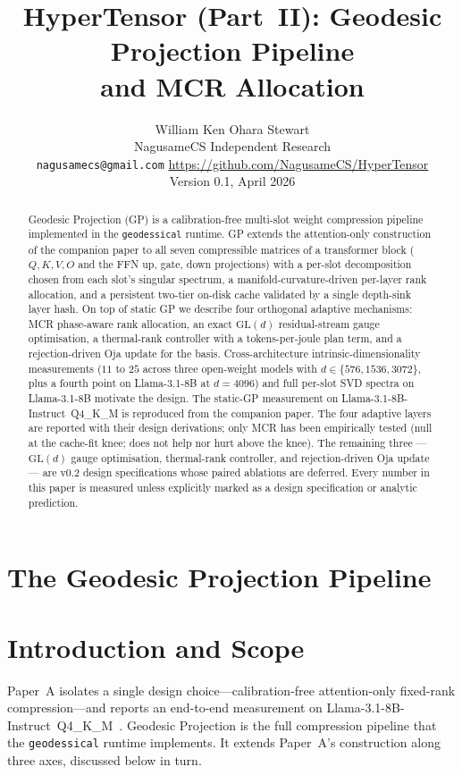 \documentclass[11pt]{article}
\title{HyperTensor (Part~II): Geodesic Projection Pipeline\\and MCR Allocation}
\author{William Ken Ohara Stewart\\
\small NagusameCS Independent Research\\
\small \texttt{nagusamecs@gmail.com} \quad \url{https://github.com/NagusameCS/HyperTensor}\\
\small Version 0.1, April 2026}
\date{}
\begin{document}
\maketitle

\begin{abstract}
\noindent
Geodesic Projection (GP) is a calibration-free multi-slot weight
compression pipeline implemented in the \texttt{geodessical} runtime. GP
extends the attention-only construction of the companion paper to all
seven compressible matrices of a transformer block ($Q,K,V,O$ and the
FFN up, gate, down projections) with a per-slot decomposition chosen
from each slot's singular spectrum, a manifold-curvature-driven
per-layer rank allocation, and a persistent two-tier on-disk cache
validated by a single depth-sink layer hash. On top of static GP we
describe four orthogonal adaptive mechanisms: MCR phase-aware rank
allocation, an exact $\mathrm{GL}(d)$ residual-stream gauge
optimisation, a thermal-rank controller with a tokens-per-joule
plan term, and a rejection-driven Oja update for the basis. Cross-architecture
intrinsic-dimensionality measurements ($11$ to $25$ across three
open-weight models with $d\in\{576,1536,3072\}$, plus a fourth point
on Llama-3.1-8B at $d{=}4096$) and full per-slot SVD spectra on
Llama-3.1-8B motivate the design. The static-GP measurement on
Llama-3.1-8B-Instruct~Q4\_K\_M is reproduced from the companion paper.
The four adaptive layers are reported with their design derivations; only
MCR has been empirically tested (null at the cache-fit knee; does not help
nor hurt above the knee).  The remaining three --- $\mathrm{GL}(d)$ gauge
optimisation, thermal-rank controller, and rejection-driven Oja update ---
are v0.2 design specifications whose paired ablations are deferred.  Every
number in this paper is measured unless explicitly marked as a design
specification or analytic prediction.
\end{abstract}

\section*{The Geodesic Projection Pipeline}

\section{Introduction and Scope}
Paper~A isolates a single design choice---calibration-free
attention-only fixed-rank compression---and reports an end-to-end
measurement on Llama-3.1-8B-Instruct~Q4\_K\_M~\cite{stewart2026grc}.
Geodesic Projection is the full compression pipeline that the
\texttt{geodessical} runtime implements. It extends Paper~A's
construction along three axes, discussed below in turn.
\end{document}
